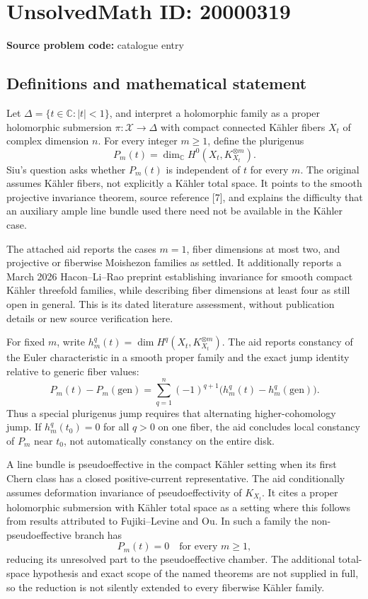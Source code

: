 \documentclass[11pt]{article}
\newcommand{\C}{\mathbb{C}}
\begin{document}
\section*{UnsolvedMath ID: 20000319}
\textbf{Source problem code:} catalogue entry
\subsection{Definitions and mathematical statement}
Let \(\Delta=\{t\in\C:|t|<1\}\), and interpret a holomorphic family as a proper holomorphic submersion \(\pi:\mathcal X\to\Delta\) with compact connected K\"ahler fibers \(X_t\) of complex dimension \(n\). For every integer \(m\geq1\), define the plurigenus
\[
P_m(t)=\dim_{\C}H^0(X_t,K_{X_t}^{\otimes m}).
\]
Siu's question asks whether \(P_m(t)\) is independent of \(t\) for every \(m\). The original assumes K\"ahler fibers, not explicitly a K\"ahler total space. It points to the smooth projective invariance theorem, source reference [7], and explains the difficulty that an auxiliary ample line bundle used there need not be available in the K\"ahler case.

The attached aid reports the cases \(m=1\), fiber dimensions at most two, and projective or fiberwise Moishezon families as settled. It additionally reports a March 2026 Hacon--Li--Rao preprint establishing invariance for smooth compact K\"ahler threefold families, while describing fiber dimensions at least four as still open in general. This is its dated literature assessment, without publication details or new source verification here.

For fixed \(m\), write \(h_m^q(t)=\dim H^q(X_t,K_{X_t}^{\otimes m})\). The aid reports constancy of the Euler characteristic in a smooth proper family and the exact jump identity relative to generic fiber values:
\[
P_m(t)-P_m(\mathrm{gen})=
\sum_{q=1}^n(-1)^{q+1}\bigl(h_m^q(t)-h_m^q(\mathrm{gen})\bigr).
\]
Thus a special plurigenus jump requires that alternating higher-cohomology jump. If \(h_m^q(t_0)=0\) for all \(q>0\) on one fiber, the aid concludes local constancy of \(P_m\) near \(t_0\), not automatically constancy on the entire disk.

A line bundle is pseudoeffective in the compact K\"ahler setting when its first Chern class has a closed positive-current representative. The aid conditionally assumes deformation invariance of pseudoeffectivity of \(K_{X_t}\). It cites a proper holomorphic submersion with K\"ahler total space as a setting where this follows from results attributed to Fujiki--Levine and Ou. In such a family the non-pseudoeffective branch has
\[
P_m(t)=0\quad\text{for every }m\geq1,
\]
reducing its unresolved part to the pseudoeffective chamber. The additional total-space hypothesis and exact scope of the named theorems are not supplied in full, so the reduction is not silently extended to every fiberwise K\"ahler family.
\end{document}
